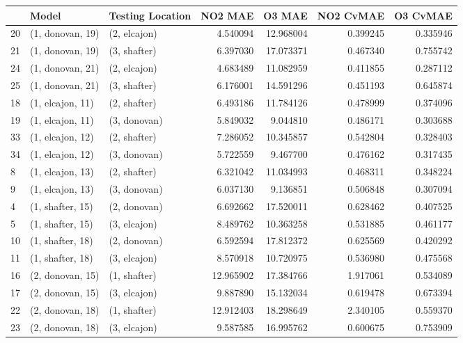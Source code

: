\begin{tabular}{lllrrrr}
\toprule
{} &             Model & Testing Location &    NO2 MAE &     O3 MAE &  NO2 CvMAE &  O3 CvMAE \\
\midrule
20 &  (1, donovan, 19) &     (2, elcajon) &   4.540094 &  12.968004 &   0.399245 &  0.335946 \\
21 &  (1, donovan, 19) &     (3, shafter) &   6.397030 &  17.073371 &   0.467340 &  0.755742 \\
24 &  (1, donovan, 21) &     (2, elcajon) &   4.683489 &  11.082959 &   0.411855 &  0.287112 \\
25 &  (1, donovan, 21) &     (3, shafter) &   6.176001 &  14.591296 &   0.451193 &  0.645874 \\
18 &  (1, elcajon, 11) &     (2, shafter) &   6.493186 &  11.784126 &   0.478999 &  0.374096 \\
19 &  (1, elcajon, 11) &     (3, donovan) &   5.849032 &   9.044810 &   0.486171 &  0.303688 \\
33 &  (1, elcajon, 12) &     (2, shafter) &   7.286052 &  10.345857 &   0.542804 &  0.328403 \\
34 &  (1, elcajon, 12) &     (3, donovan) &   5.722559 &   9.467700 &   0.476162 &  0.317435 \\
8  &  (1, elcajon, 13) &     (2, shafter) &   6.321042 &  11.034993 &   0.468311 &  0.348224 \\
9  &  (1, elcajon, 13) &     (3, donovan) &   6.037130 &   9.136851 &   0.506848 &  0.307094 \\
4  &  (1, shafter, 15) &     (2, donovan) &   6.692662 &  17.520011 &   0.628462 &  0.407525 \\
5  &  (1, shafter, 15) &     (3, elcajon) &   8.489762 &  10.363258 &   0.531885 &  0.461177 \\
10 &  (1, shafter, 18) &     (2, donovan) &   6.592594 &  17.812372 &   0.625569 &  0.420292 \\
11 &  (1, shafter, 18) &     (3, elcajon) &   8.570918 &  10.720975 &   0.536980 &  0.475568 \\
16 &  (2, donovan, 15) &     (1, shafter) &  12.965902 &  17.384766 &   1.917061 &  0.534089 \\
17 &  (2, donovan, 15) &     (3, elcajon) &   9.887890 &  15.132034 &   0.619478 &  0.673394 \\
22 &  (2, donovan, 18) &     (1, shafter) &  12.912403 &  18.298649 &   2.340105 &  0.559370 \\
23 &  (2, donovan, 18) &     (3, elcajon) &   9.587585 &  16.995762 &   0.600675 &  0.753909 \\

\end{tabular}
